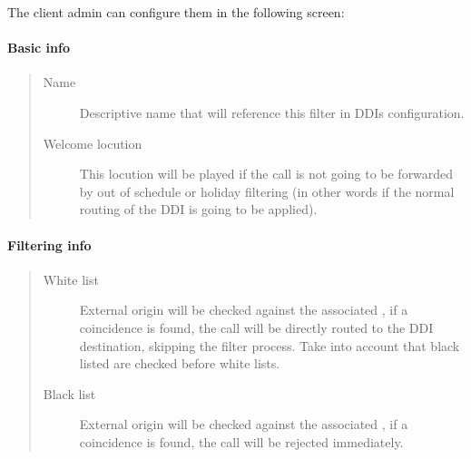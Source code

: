 \documentclass[letterpaper,10pt,english]{sphinxmanual}
\begin{document}
The client admin can configure them in the following screen:


\paragraph{Basic info}
\label{administration_portal/client/vpbx/routing_tools/external_call_filters:basic-info}\begin{quote}
\begin{description}
\item[{Name}] \leavevmode
Descriptive name that will reference this filter in DDIs configuration.

\item[{Welcome locution}] \leavevmode
This locution will be played if the call is not going to be
forwarded by out of schedule or holiday filtering (in other words if
the normal routing of the DDI is going to be applied).

\end{description}
\end{quote}


\paragraph{Filtering info}
\label{administration_portal/client/vpbx/routing_tools/external_call_filters:filtering-info}\begin{quote}
\begin{description}
\item[{White list}] \leavevmode
External origin will be checked against the associated {\hyperref[administration_portal/client/vpbx/routing_tools/match_lists:match\string-lists]{}},
if a coincidence is found, the call will be directly routed to the DDI
destination, skipping the filter process. Take into account that black
listed are checked before white lists.

\item[{Black list}] \leavevmode
External origin will be checked against the associated {\hyperref[administration_portal/client/vpbx/routing_tools/match_lists:match\string-lists]{}},
if a coincidence is found, the call will be rejected immediately.

\end{description}
\end{quote}
\end{document}
